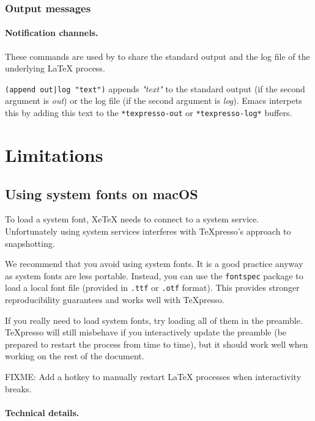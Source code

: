 \documentclass{article}
\begin{document}
\subsubsection{Output messages}

\paragraph{Notification channels.} These commands are used by \txp to share the standard output and the log file of the underlying \LaTeX{} process.

\texttt{(append out|log "text")} appends {\em "text"} to the standard output (if the second argument is {\em out}) or the log file (if the second argument is {\em log}). Emacs interpets this by adding this text to the \texttt{*texpresso-out} or \texttt{*texpresso-log*} buffers.

\section{Limitations}

\subsection{Using system fonts on macOS}

To load a system font, XeTeX needs to connect to a system service. 
Unfortunately using system services interferes with TeXpresso's approach to snapshotting.

We recommend that you avoid using system fonts. It is a good practice anyway as system fonts are less portable. Instead, you can use the \texttt{fontspec} package to load a local font file (provided in \texttt{.ttf} or \texttt{.otf} format). This provides stronger reproducibility guarantees and works well with TeXpresso.

If you really need to load system fonts, try loading all of them in the preamble. TeXpresso will still misbehave if you interactively update the preamble (be prepared to restart the process from time to time), but it should work well when working on the rest of the document.

FIXME: Add a hotkey to manually restart \LaTeX{} processes when interactivity breaks.

\paragraph{Technical details.}
\end{document}
